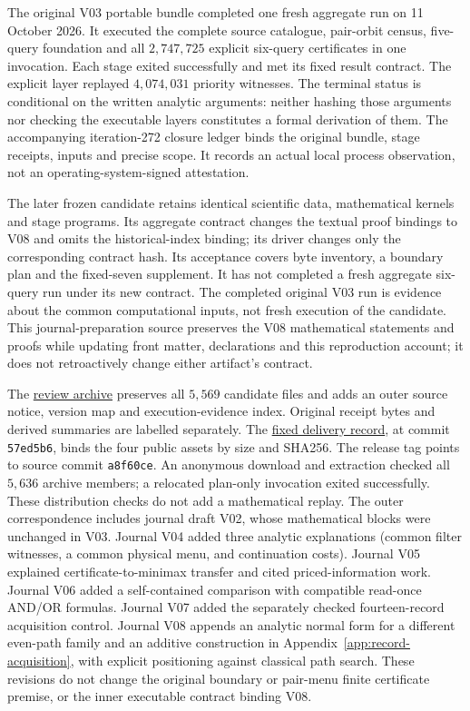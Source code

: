 \documentclass[pdflatex,sn-mathphys-num]{sn-jnl}
\theoremstyle{thmstyleone}
\theoremstyle{thmstylethree}
\theoremstyle{thmstyletwo}
\begin{document}
The original V03 portable bundle completed one fresh aggregate run on 11 October 2026. It executed the complete source catalogue, pair-orbit census, five-query foundation and all $2,747,725$ explicit six-query certificates in one invocation. Each stage exited successfully and met its fixed result contract. The explicit layer replayed $4,074,031$ priority witnesses. The terminal status is conditional on the written analytic arguments: neither hashing those arguments nor checking the executable layers constitutes a formal derivation of them. The accompanying iteration-272 closure ledger binds the original bundle, stage receipts, inputs and precise scope. It records an actual local process observation, not an operating-system-signed attestation.

The later frozen candidate retains identical scientific data, mathematical kernels and stage programs. Its aggregate contract changes the textual proof bindings to V08 and omits the historical-index binding; its driver changes only the corresponding contract hash. Its acceptance covers byte inventory, a boundary plan and the fixed-seven supplement. It has not completed a fresh aggregate six-query run under its new contract. The completed original V03 run is evidence about the common computational inputs, not fresh execution of the candidate. This journal-preparation source preserves the V08 mathematical statements and proofs while updating front matter, declarations and this reproduction account; it does not retroactively change either artifact's contract.

The \href{https://github.com/SHiJiE1115/newproj/releases/tag/complete-six-review-20261011-v01}{review archive} preserves all $5,569$ candidate files and adds an outer source notice, version map and execution-evidence index. Original receipt bytes and derived summaries are labelled separately. The \href{https://github.com/SHiJiE1115/newproj/blob/57ed5b69243fec06c2a7a58f062f3793f6557738/theory/complete_six/PUBLIC_DELIVERY_RECEIPT_V01.json}{fixed delivery record}, at commit \texttt{57ed5b6}, binds the four public assets by size and SHA256. The release tag points to source commit \texttt{a8f60ce}. An anonymous download and extraction checked all $5,636$ archive members; a relocated plan-only invocation exited successfully. These distribution checks do not add a mathematical replay. The outer correspondence includes journal draft V02, whose mathematical blocks were unchanged in V03. Journal V04 added three analytic explanations (common filter witnesses, a common physical menu, and continuation costs). Journal V05 explained certificate-to-minimax transfer and cited priced-information work. Journal V06 added a self-contained comparison with compatible read-once AND/OR formulas. Journal V07 added the separately checked fourteen-record acquisition control. Journal V08 appends an analytic normal form for a different even-path family and an additive construction in Appendix~\ref{app:record-acquisition}, with explicit positioning against classical path search. These revisions do not change the original boundary or pair-menu finite certificate premise, or the inner executable contract binding V08.
\end{document}
